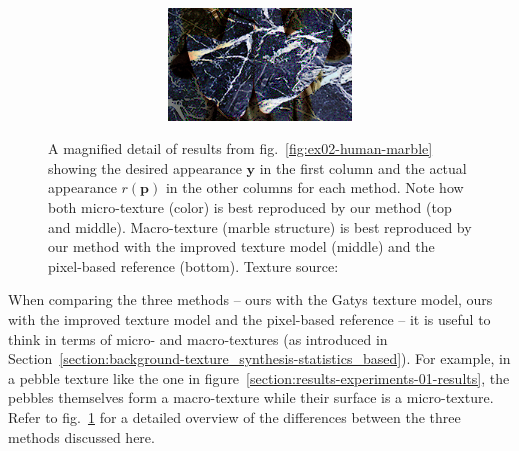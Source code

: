 \begin{figure}[]
\begin{subfigure}{0.6\textwidth}
\begin{subfigure}{0.48\textwidth}
            \begin{subfigure}{\textwidth}
                \centering
                \includegraphics[width=\textwidth]{images/04-experiment02/human/marble/pixel_proj_crop_yellow.jpeg}
                \caption*{}
            \end{subfigure}
        \end{subfigure}
    \end{subfigure}
    \caption{A magnified detail of results from fig.~\ref{fig:ex02-human-marble} showing the desired appearance \(\bm{y}\) in the first column and the actual appearance \(r(\bm{p})\) in the other columns for each method. Note how both micro-texture (color) is best reproduced by our method (top and middle). Macro-texture (marble structure) is best reproduced by our method with the improved texture model (middle) and the pixel-based reference (bottom). Texture source: \citet{Pixar128}}
    \label{fig:ex02-human-marble-detail}
\end{figure}

When comparing the three methods -- ours with the Gatys texture model, ours with the improved texture model and the pixel-based reference -- it is useful to think in terms of micro- and macro-textures (as introduced in Section~\ref{section:background-texture_synthesis-statistics_based}). For example, in a pebble texture like the one in figure~\ref{section:results-experiments-01-results}, the pebbles themselves form a macro-texture while their surface is a micro-texture. Refer to fig.~\ref{fig:ex02-human-marble-detail} for a detailed overview of the differences between the three methods discussed here.

